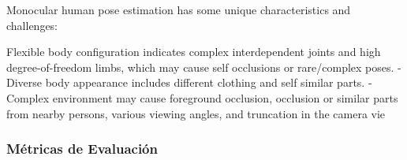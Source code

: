 Monocular human pose estimation has some unique characteristics
and challenges:

Flexible body configuration indicates complex interdependent
joints and high degree-of-freedom limbs, which may cause self occlusions or rare/complex poses.
- Diverse body appearance includes different clothing and self similar parts.
- Complex environment may cause foreground occlusion, occlusion
or similar parts from nearby persons, various viewing angles, and
truncation in the camera vie



\subsubsection{Métricas de Evaluación}





